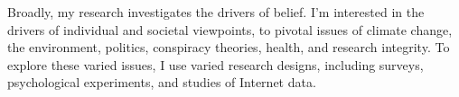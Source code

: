 

\begin{small} \color{black}
Broadly, my research investigates the drivers of belief. I'm interested in the drivers of individual and societal viewpoints, to pivotal issues of climate change, the environment, politics, conspiracy theories, health, and research integrity. To explore these varied issues, I use varied research designs, including surveys, psychological experiments, and studies of Internet data.
\end{small}

